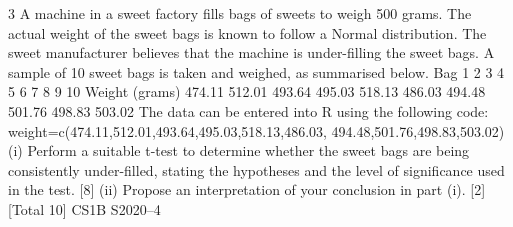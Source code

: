 \documentclass[a4paper,12pt]{article}
\begin{document}
\large 
\noindent

3 A machine in a sweet factory fills bags of sweets to weigh 500 grams. The actual
weight of the sweet bags is known to follow a Normal distribution. The sweet
manufacturer believes that the machine is under-filling the sweet bags. A sample of
10 sweet bags is taken and weighed, as summarised below.
Bag 1 2 3 4 5 6 7 8 9 10
Weight (grams) 474.11 512.01 493.64 495.03 518.13 486.03 494.48 501.76 498.83 503.02
The data can be entered into R using the following code:
weight=c(474.11,512.01,493.64,495.03,518.13,486.03,
494.48,501.76,498.83,503.02)
(i) Perform a suitable t-test to determine whether the sweet bags are being
consistently under-filled, stating the hypotheses and the level of significance
used in the test. [8]
(ii) Propose an interpretation of your conclusion in part (i). [2]
[Total 10]
CS1B S2020–4
\end{document}
